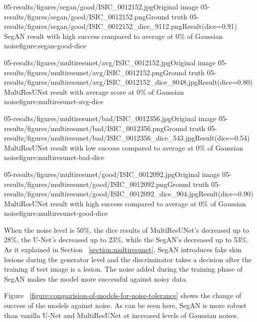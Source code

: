     \sidebyside
        {05-results/figures/segan/good/ISIC_0012152.jpg}{Original image}
        {05-results/figures/segan/good/ISIC_0012152.png}{Ground truth}
        {05-results/figures/segan/good/ISIC_0012152_dice_9112.png}{Result(dice=0.91)}
        {SegAN result with high success compared to average at 0\% of Gaussian noise}{figure:segan-good-dice}

    \sidebyside
        {05-results/figures/multiresunet/avg/ISIC_0012152.jpg}{Original image}
        {05-results/figures/multiresunet/avg/ISIC_0012152.png}{Ground truth}
        {05-results/figures/multiresunet/avg/ISIC_0012152_dice_8048.jpg}{Result(dice=0.80)}
        {MultiResUNet result with average score at 0\% of Gaussian noise}{figure:multiresunet-avg-dice}

    \sidebyside
        {05-results/figures/multiresunet/bad/ISIC_0012356.jpg}{Original image}
        {05-results/figures/multiresunet/bad/ISIC_0012356.png}{Ground truth}
        {05-results/figures/multiresunet/bad/ISIC_0012356_dice_543.jpg}{Result(dice=0.54)}
        {MultiResUNet result with low success compared to average at 0\% of Gaussian noise}{figure:multiresunet-bad-dice}

    \sidebyside
        {05-results/figures/multiresunet/good/ISIC_0012092.jpg}{Original image}
        {05-results/figures/multiresunet/good/ISIC_0012092.png}{Ground truth}
        {05-results/figures/multiresunet/good/ISIC_0012092_dice_904.jpg}{Result(dice=0.90)}
        {MultiResUNet result with high success compared to average at 0\% of Gaussian noise}{figure:multiresunet-good-dice}

    When the noise level is 50\%, the dice results of MultiResUNet's decreased up to 28\%, the U-Net's decreased up to 23\%, while the SegAN's decreased up to 53\%.
    As it explained in Section ~\ref{section:multiresunet}, SegAN introduces fake skin lesions during the generator level and the discriminator
    takes a decision after the training if test image is a lesion.
    The noise added during the training phase of SegAN makes the model more successful against noisy data.

    Figure ~\ref{figure:comparision-of-models-for-noise-tolerance} shows the change of success of the models against noise.
    As can be seen here, SegAN is more robust than vanilla U-Net and MultiResUNet at increased levels of Gaussian noises.

    

    

